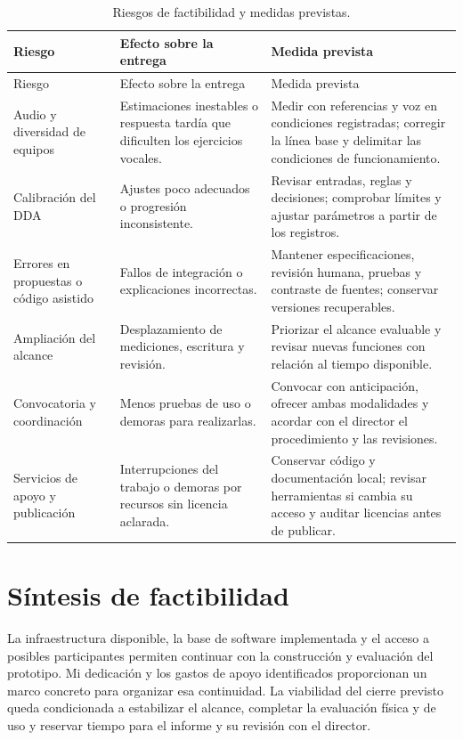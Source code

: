 \begingroup
\small
\singlespacing
\setlength{\tabcolsep}{4pt}
\setlength{\LTcapwidth}{\textwidth}
\begin{longtable}{p{}p{}p{}}
\caption{Riesgos de factibilidad y medidas previstas.}
\label{tab:riesgos-factibilidad}\\
\toprule
Riesgo & Efecto sobre la entrega & Medida prevista \\
\midrule
\endfirsthead
\toprule
Riesgo & Efecto sobre la entrega & Medida prevista \\
\midrule
\endhead
\bottomrule
\endfoot
Audio y diversidad de equipos & Estimaciones inestables o respuesta tardía que dificulten los ejercicios vocales. & Medir con referencias y voz en condiciones registradas; corregir la línea base y delimitar las condiciones de funcionamiento. \\
Calibración del DDA & Ajustes poco adecuados o progresión inconsistente. & Revisar entradas, reglas y decisiones; comprobar límites y ajustar parámetros a partir de los registros. \\
Errores en propuestas o código asistido & Fallos de integración o explicaciones incorrectas. & Mantener especificaciones, revisión humana, pruebas y contraste de fuentes; conservar versiones recuperables. \\
Ampliación del alcance & Desplazamiento de mediciones, escritura y revisión. & Priorizar el alcance evaluable y revisar nuevas funciones con relación al tiempo disponible. \\
Convocatoria y coordinación & Menos pruebas de uso o demoras para realizarlas. & Convocar con anticipación, ofrecer ambas modalidades y acordar con el director el procedimiento y las revisiones. \\
Servicios de apoyo y publicación & Interrupciones del trabajo o demoras por recursos sin licencia aclarada. & Conservar código y documentación local; revisar herramientas si cambia su acceso y auditar licencias antes de publicar. \\
\end{longtable}
\endgroup

\section{Síntesis de factibilidad}
La infraestructura disponible, la base de software implementada y el acceso a
posibles participantes permiten continuar con la construcción y evaluación del
prototipo. Mi dedicación y los gastos de apoyo identificados proporcionan un
marco concreto para organizar esa continuidad. La viabilidad del cierre previsto
queda condicionada a estabilizar el alcance, completar la evaluación física y
de uso y reservar tiempo para el informe y su revisión con el director.
